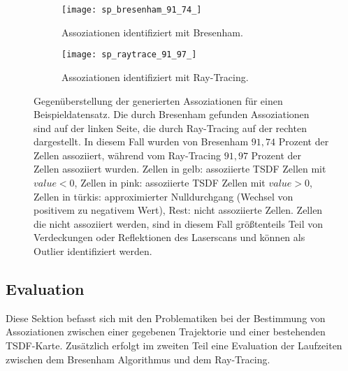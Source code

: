 \begin{figure}
	\centering
	\begin{subfigure}{.5\textwidth}
 		 \centering
  		 \texttt{[image: sp\_bresenham\_91\_74\_]}
  		 \centering \caption{Assoziationen identifiziert mit Bresenham.}
  		 \label{fig:sp_bresenham}
	\end{subfigure}%
	\begin{subfigure}{.5\textwidth}
    	\centering
  		\texttt{[image: sp\_raytrace\_91\_97\_]}
  		\centering \caption{Assoziationen identifiziert mit Ray-Tracing.}
  		\label{fig:sp_raytrace}
	\end{subfigure}
	\caption{Gegenüberstellung der generierten Assoziationen für einen Beispieldatensatz. Die durch Bresenham gefunden Assoziationen sind auf der linken Seite, die durch Ray-Tracing auf der rechten dargestellt. In diesem Fall wurden von Bresenham $91,74$ Prozent der Zellen assoziiert, während vom Ray-Tracing $91,97$ Prozent der Zellen assoziiert wurden. Zellen in gelb: assoziierte TSDF Zellen mit $value < 0$, Zellen in pink: assoziierte TSDF Zellen mit $value > 0$, Zellen in türkis: approximierter Nulldurchgang (Wechsel von positivem zu negativem Wert), Rest: nicht assoziierte Zellen. Zellen die nicht assoziiert werden, sind in diesem Fall größtenteils Teil von Verdeckungen oder Reflektionen des Laserscans und können als Outlier identifiziert werden.}
	\label{fig:bresenham_vs_raytrace}
\end{figure}

\subsection{Evaluation}
\label{section:association_evaluation}

Diese Sektion befasst sich mit den Problematiken bei der Bestimmung von Assoziationen zwischen einer gegebenen Trajektorie und einer bestehenden TSDF-Karte. Zusätzlich erfolgt im zweiten Teil eine Evaluation der Laufzeiten zwischen dem Bresenham Algorithmus und dem Ray-Tracing. 

